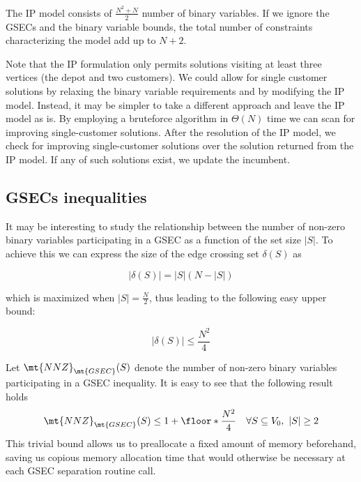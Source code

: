 The IP model consists of $\frac{N^2 + N}{2}$ number of binary variables.
If we ignore the GSECs and the binary variable bounds, the total number of constraints characterizing the model add up to $N + 2$.

Note that the IP formulation only permits solutions visiting at least three vertices (the depot and two customers).
We could allow for single customer solutions by relaxing the binary variable requirements and by modifying the IP model.
Instead, it may be simpler to take a different approach and leave the IP model as is.
By employing a bruteforce algorithm in $\Theta(N)$ time we can scan for improving single-customer solutions.
After the resolution of the IP model, we check for improving single-customer solutions over the solution returned from the IP model.
If any of such solutions exist, we update the incumbent.

\subsection{GSECs inequalities}\label{sec:gsec-inequality}



It may be interesting to study the relationship between the number of non-zero binary variables participating in a GSEC as a function of the set size $|S|$.
To achieve this we can express the size of the edge crossing set $\delta(S)$ as

\begin{equation}\label{eq:delta-s-set-size}
	|\delta(S)| = |S| (N - |S|)
\end{equation}

which is maximized when $|S| = \frac{N}{2}$, thus leading to the following easy upper bound:

\begin{equation}\label{eq:delta-s-set-size-ub}
	|\delta(S)| \le \frac{N^2}{4}
\end{equation}

Let $\mt{NNZ}_{\mt{GSEC}}(S)$ denote the number of non-zero binary variables participating in a GSEC inequality.
It is easy to see that the following result holds
\begin{equation}\label{eq:gsec-nnz-ub}
	\mt{NNZ}_{\mt{GSEC}}(S) \le 1 + \floor*{\frac{N^2}{4}} \quad \forall S \subseteq V_0,\ |S| \ge 2
\end{equation}
This trivial bound allows us to preallocate a fixed amount of memory beforehand, saving us copious memory allocation time that would otherwise be necessary at each GSEC separation routine call.

